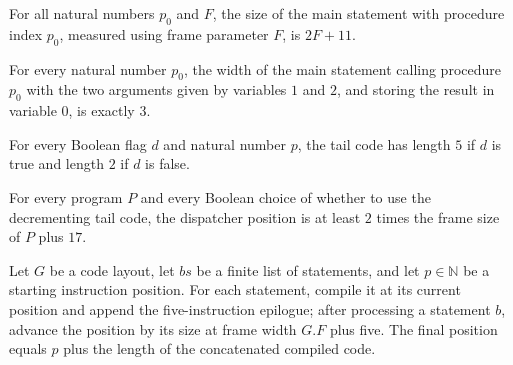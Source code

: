 \begin{theorem}
\label{Light.Compiler.size_mainStmt}
\leanok
{}
For all natural numbers $p_0$ and $F$, the size of the main statement with procedure
index $p_0$, measured using frame parameter $F$, is $2F+11$.
\end{theorem}

\begin{theorem}
\label{Light.Compiler.width_mainStmt}
\leanok
{}
For every natural number $p_0$, the width of the main statement calling procedure $p_0$
with the two arguments given by variables $1$ and $2$, and storing the result in
variable $0$, is exactly $3$.
\end{theorem}

\begin{theorem}
\label{Light.Compiler.length_tailCode}
\leanok
{}
For every Boolean flag $d$ and natural number $p$, the tail code has length $5$ if $d$
is true and length $2$ if $d$ is false.
\end{theorem}

\begin{theorem}
\label{Light.Compiler.two_mul_frameSize_add_le_dispPos}
\leanok
{}
For every program $P$ and every Boolean choice of whether to use the decrementing tail
code, the dispatcher position is at least $2$ times the frame size of $P$ plus $17$.
\end{theorem}

\begin{theorem}
\label{Light.Compiler.length_bodiesCode}
\leanok
{}
Let $G$ be a code layout, let $bs$ be a finite list of statements, and let $p\in\mathbb
N$ be a starting instruction position. For each statement, compile it at its current
position and append the five-instruction epilogue; after processing a statement $b$,
advance the position by its size at frame width $G.F$ plus five. The final position
equals $p$ plus the length of the concatenated compiled code.
\end{theorem}

